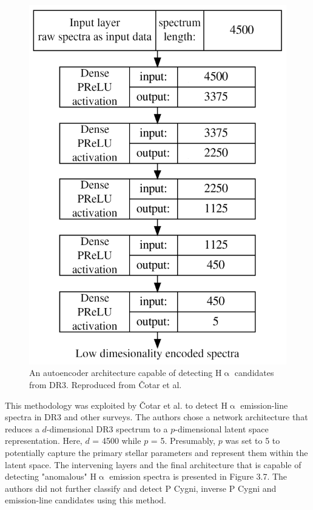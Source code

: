 \begin{figure}[!htb]
\centering
\includegraphics[scale=0.45]{figures/autoencoder.png}
\caption{An autoencoder architecture capable of detecting H$\upalpha$ candidates from DR3. Reproduced from Čotar et al.\cite{vcotar2021galah}}
\end{figure}

This methodology was exploited by Čotar et al. to detect H$\upalpha$ emission-line spectra in DR3 and other surveys\cite{vcotar2021galah}. The authors chose a network architecture that reduces a $d$-dimensional DR3 spectrum to a $p$-dimensional latent space representation. Here, $d$ = 4500 while $p$ = 5. Presumably, $p$ was set to 5 to potentially capture the primary stellar parameters and represent them within the latent space. The intervening layers and the final architecture that is capable of detecting "anomalous" H$\upalpha$ emission spectra is presented in Figure 3.7. The authors did not further classify and detect P Cygni, inverse P Cygni and emission-line candidates using this method. 

